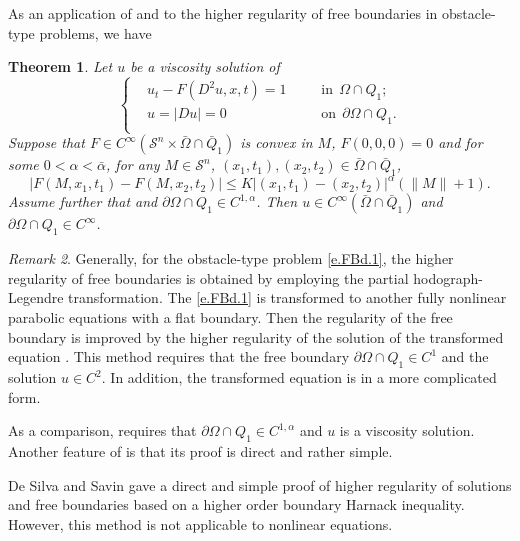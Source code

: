 \documentclass[preprint,12pt]{elsarticle}
\newtheorem{theorem}{Theorem}[section]
\theoremstyle{definition}
\theoremstyle{remark}
\newtheorem{remark}[theorem]{Remark}
\numberwithin{equation}{section}
\begin{document}
As an application of  and  to the higher regularity of free boundaries in obstacle-type problems, we have
\begin{theorem}\label{FreeBd}
Let $u$ be a viscosity solution of
\begin{equation}\label{e.FBd.1}
\left\{\begin{aligned}
   &u_t-F(D^2 u,x,t)=1~~~~&&\mbox{in}~~\Omega \cap Q_1;\\
   &u=|Du|=0~~~~&&\mbox{on}~~\partial \Omega\cap Q_1.\\
\end{aligned}\right.
\end{equation}
Suppose that $F\in C^{\infty}(\mathcal{S}^n\times \bar\Omega\cap \bar Q_{1})$ is convex in $M$, $F(0,0,0)=0$ and for some $0<\alpha<\bar{\alpha}$, for any $M\in \mathcal{S}^n$, $ (x_1,t_1),(x_2,t_2)\in \bar{\Omega}\cap \bar Q_1$,
\begin{equation}\label{e1.10}
|F(M,x_1,t_1)-F(M,x_2,t_2)|\leq K|(x_1,t_1)-(x_2,t_2)|^{\alpha}(\|M\|+1).
\end{equation}
Assume further that and $\partial \Omega\cap Q_1\in C^{1,\alpha}$. Then $u\in C^{\infty} (\bar\Omega\cap \bar Q_{1})$ and $\partial \Omega\cap Q_1\in C^{\infty}$.
\end{theorem}

\begin{remark}\label{re.freeb.1}
Generally, for the obstacle-type problem \cref{e.FBd.1}, the higher regularity of free boundaries is obtained by employing the partial hodograph-Legendre transformation. The \cref{e.FBd.1} is transformed to another fully nonlinear parabolic equations with a flat boundary. Then the regularity of the free boundary is improved by the higher regularity of the solution of the transformed equation \cite{MR440187}. This method requires that the free boundary $\partial \Omega\cap Q_1 \in C^1$ and the solution $u \in C^2$. In addition, the transformed equation is in a more complicated form.

As a comparison,  requires that $\partial \Omega\cap Q_1 \in C^{1,\alpha}$ and $u$ is a viscosity solution. Another feature of  is that its proof is direct and rather simple.

De Silva and Savin \cite{MR3393271} gave a direct and simple proof of higher regularity of solutions and free boundaries based on a higher order boundary Harnack inequality. However, this method is not applicable to nonlinear equations.
\end{remark}
~\\
\end{document}
